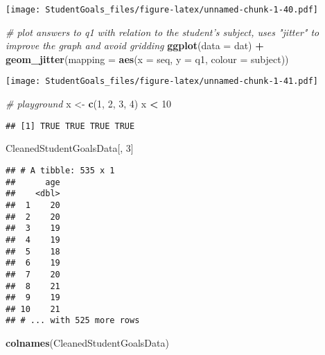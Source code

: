 \documentclass[]{article}
\newenvironment{Shaded}{\begin{snugshade}}{\end{snugshade}}
\newcommand{\CommentTok}[1]{\textcolor[rgb]{0.56,0.35,0.01}{\textit{#1}}}
\newcommand{\DataTypeTok}[1]{\textcolor[rgb]{0.13,0.29,0.53}{#1}}
\newcommand{\DecValTok}[1]{\textcolor[rgb]{0.00,0.00,0.81}{#1}}
\newcommand{\KeywordTok}[1]{\textcolor[rgb]{0.13,0.29,0.53}{\textbf{#1}}}
\newcommand{\NormalTok}[1]{#1}
\newcommand{\OperatorTok}[1]{\textcolor[rgb]{0.81,0.36,0.00}{\textbf{#1}}}
\newcommand{\StringTok}[1]{\textcolor[rgb]{0.31,0.60,0.02}{#1}}
\begin{document}
\texttt{[image: StudentGoals\_files/figure-latex/unnamed-chunk-1-40.pdf]}

\begin{Shaded}
\begin{Highlighting}[]
\CommentTok{# plot answers to q1 with relation to the student's subject, uses "jitter" to improve the graph and avoid gridding}
\KeywordTok{ggplot}\NormalTok{(}\DataTypeTok{data =}\NormalTok{ dat) }\OperatorTok{+}\StringTok{ }
\StringTok{  }\KeywordTok{geom_jitter}\NormalTok{(}\DataTypeTok{mapping =} \KeywordTok{aes}\NormalTok{(}\DataTypeTok{x =}\NormalTok{ seq, }\DataTypeTok{y =}\NormalTok{ q1, }\DataTypeTok{colour =}\NormalTok{ subject))}
\end{Highlighting}
\end{Shaded}

\texttt{[image: StudentGoals\_files/figure-latex/unnamed-chunk-1-41.pdf]}

\begin{Shaded}
\begin{Highlighting}[]
\CommentTok{# playground}
\NormalTok{x <-}\StringTok{ }\KeywordTok{c}\NormalTok{(}\DecValTok{1}\NormalTok{, }\DecValTok{2}\NormalTok{, }\DecValTok{3}\NormalTok{, }\DecValTok{4}\NormalTok{)}
\NormalTok{x }\OperatorTok{<}\StringTok{ }\DecValTok{10}
\end{Highlighting}
\end{Shaded}

\begin{verbatim}
## [1] TRUE TRUE TRUE TRUE
\end{verbatim}

\begin{Shaded}
\begin{Highlighting}[]
\NormalTok{CleanedStudentGoalsData[, }\DecValTok{3}\NormalTok{]}
\end{Highlighting}
\end{Shaded}

\begin{verbatim}
## # A tibble: 535 x 1
##      age
##    <dbl>
##  1    20
##  2    20
##  3    19
##  4    19
##  5    18
##  6    19
##  7    20
##  8    21
##  9    19
## 10    21
## # ... with 525 more rows
\end{verbatim}

\begin{Shaded}
\begin{Highlighting}[]
\KeywordTok{colnames}\NormalTok{(CleanedStudentGoalsData)}
\end{Highlighting}
\end{Shaded}
\end{document}
